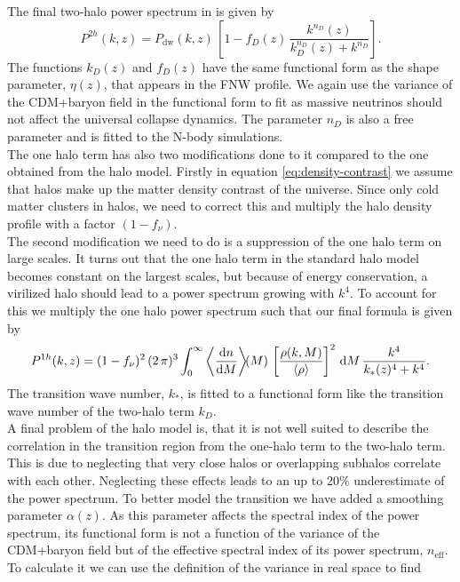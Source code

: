 \documentclass[../main.tex]{subfiles}
\begin{document}
The final two-halo power spectrum in \hmcode is given by \begin{equation}
    P^{2h}(k,z) = P_\mathrm{dw}(k,z)\,\left[1-f_D(z)\,\frac{k^{n_D}(z)}{k_D^{n_D}(z)+k^{n_D}}\right].
\end{equation}
The functions $k_D(z)$ and $f_D(z)$ have the same functional form as the shape parameter, $\eta(z)$, that appears in the FNW profile. We again use the variance of the CDM+baryon field in the functional form to fit as massive neutrinos should not affect the universal collapse dynamics. The parameter $n_D$ is also a free parameter and is fitted to the N-body simulations.\\
The one halo term has also two modifications done to it compared to the one obtained from the halo model. Firstly in equation \ref{eq:density-contrast} we assume that halos make up the matter density contrast of the universe. Since only cold matter clusters in halos, we need to correct this and multiply the halo density profile with a factor $(1-f_\nu)$.\\
The second modification we need to do is a suppression of the one halo term on large scales. It turns out that the one halo term in the standard halo model becomes constant on the largest scales, but because of energy conservation, a virilized halo should lead to a power spectrum growing with $k^4$. To account for this we multiply the one halo power spectrum such that our final formula is given by
\begin{equation}
    P^{1h}(k,z) = (1-f_\nu)^2\,(2\,\pi)^3\int_0^\infty \left\langle\frac{\mathrm{d} n}{\mathrm{d} M}\right\rangle\!\!(M)\,\left[\frac{\rho(k,M)}{\langle \rho \rangle}\right]^2 \,\mathrm{d} M\,\frac{k^4}{k_*(z)^4+k^4}.
\end{equation}
The transition wave number, $k_*$, is fitted to a functional form like the transition wave number of the two-halo term $k_D$.\\
A final problem of the halo model is, that it is not well suited to describe the correlation in the transition region from the one-halo term to the two-halo term. This is due to neglecting that very close halos or overlapping subhalos correlate with each other. Neglecting these effects leads to an up to 20\% underestimate of the power spectrum. To better model the transition we have added a smoothing parameter $\alpha(z)$. As this parameter affects the spectral index of the power spectrum, its functional form is not a function of the variance of the CDM+baryon field but of the effective spectral index of its power spectrum, $n_\mathrm{eff}$. To calculate it we can use the definition of the variance in real space to find 
\end{document}
